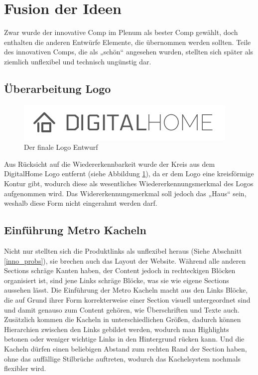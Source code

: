 \section{Fusion der Ideen}
Zwar wurde der innovative Comp im Plenum als bester Comp gewählt, doch enthalten die anderen Entwürfe Elemente, die übernommen werden sollten. Teile des innovativen Comps, die als „schön“ angesehen wurden, stellten sich später als ziemlich unflexibel und technisch ungünstig dar.
\subsection{Überarbeitung Logo}
\begin{figure} [tp]
\includegraphics[width=\textwidth]{./img/logo3.png}
\caption{Der finale Logo Entwurf}
\label{logo3}
\end{figure}
Aus Rücksicht auf die Wiedererkennbarkeit wurde der Kreis aus dem DigitalHome Logo entfernt (siehe Abbildung \ref{logo3}), da er dem Logo eine kreisförmige Kontur gibt, wodurch diese als wesentliches Wiedererkennungsmerkmal des Logos aufgenommen wird. Das Widererkennungsmerkmal soll jedoch das „Haus“ sein, weshalb diese Form nicht eingerahmt werden darf.

\subsection{Einführung Metro Kacheln}
Nicht nur stellten sich die Produktlinks als unflexibel heraus (Siehe Abschnitt \ref{inno_probs}), sie brechen auch das Layout der Website. Während alle anderen Sections schräge Kanten haben, der Content jedoch in rechteckigen Blöcken organisiert ist, sind jene Links schräge Blöcke, was sie wie eigene Sections aussehen lässt. Die Einführung der Metro Kacheln macht aus den Links Blöcke, die auf Grund ihrer Form korrekterweise einer Section visuell untergeordnet sind und damit genauso zum Content gehören, wie Überschriften und Texte auch. Zusätzlich kommen die Kacheln in unterschiedlichen Größen, dadurch können Hierarchien zwischen den Links gebildet werden, wodurch man Highlights betonen oder weniger wichtige Links in den Hintergrund rücken kann. Und die Kacheln dürfen einen beliebigen Abstand zum rechten Rand der Section haben, ohne das auffällige Stilbrüche auftreten, wodurch das Kachelsystem nochmals flexibler wird.

